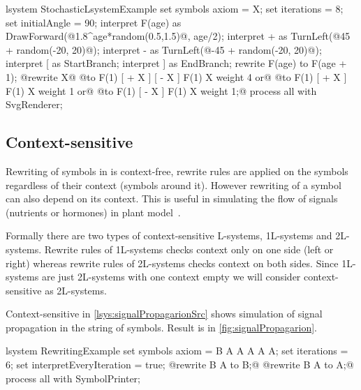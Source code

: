 \begin{Lsystem}[label=lsys:randExample,caption={Stochastic \lsystem with randomized interpretation of symbols and rewrite rule replacements}]
lsystem StochasticLsystemExample {
	set symbols axiom = X;
	set iterations = 8;
	set initialAngle = 90;
	interpret F(age) as DrawForward(@1.8^age*random(0.5,1.5)@, age/2);
	interpret + as TurnLeft(@45 + random(-20, 20)@);
	interpret - as TurnLeft(@-45 + random(-20, 20)@);
	interpret [ as StartBranch;
	interpret ] as EndBranch;
	rewrite F(age) to F(age + 1);
	@rewrite X@
		@to F(1) [ + X ] [ - X ] F(1) X  weight 4 or@
		@to F(1) [ + X ]         F(1) X  weight 1 or@
		@to F(1)         [ - X ] F(1) X  weight 1;@
}
process all with SvgRenderer;
\end{Lsystem}


\subsection{Context-sensitive \lsystems}

\newcommand{\onelsystems}{\mbox{1L-systems}\xspace}
\newcommand{\twolsystems}{\mbox{2L-systems}\xspace}

Rewriting of symbols in \zerolsystems is context-free, rewrite rules are applied on the symbols regardless of their context (symbols around it).
However rewriting of a symbol can also depend on its context.
This is useful in simulating the flow of signals (nutrients or hormones) in plant model~\citep{PL91}.

Formally there are two types of context-sensitive L-systems, \onelsystems and \twolsystems.
Rewrite rules of \onelsystems checks context only on one side (left or right) whereas rewrite rules of \twolsystems checks context on both sides.
Since \onelsystems are just \twolsystems with one context empty we will consider context-sensitive \lsystems as \twolsystems.

Context-sensitive \lsystem in \autoref{lsys:signalPropagarionSrc} shows simulation of signal propagation in the string of symbols.
Result is in \autoref{fig:signalPropagarion}.

\begin{Lsystem}[label=lsys:signalPropagarionSrc,caption={Context-sensitive \lsystems simulating signal propagation}]
lsystem RewritingExample {
	set symbols axiom = B A A A A A;
	set iterations = 6;
	set interpretEveryIteration = true;
	@rewrite {B} A     to B;@
	@rewrite     B {A} to A;@
}
process all with SymbolPrinter;
\end{Lsystem}

